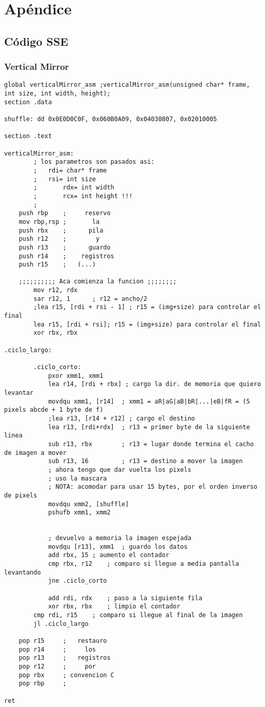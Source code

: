 \section{Ap\'endice}
\subsection{C\'odigo SSE}
\subsubsection{Vertical Mirror}
\begin{verbatim}
global verticalMirror_asm ;verticalMirror_asm(unsigned char* frame, int size, int width, height);
section .data

shuffle: dd 0x0E0D0C0F, 0x060B0A09, 0x04030807, 0x02010005

section .text

verticalMirror_asm:
        ; los parametros son pasados asi:
        ;	rdi= char* frame
        ;	rsi= int size
        ;       rdx= int width
        ;       rcx= int height !!!
        ;
	push rbp	;     reservo
	mov rbp,rsp	;       la
	push rbx	;      pila
	push r12	;        y
	push r13	;      guardo
	push r14	;    registros
	push r15	;   (...)

	;;;;;;;;;; Aca comienza la funcion ;;;;;;;;
        mov r12, rdx
        sar r12, 1      ; r12 = ancho/2
        ;lea r15, [rdi + rsi - 1] ; r15 = (img+size) para controlar el final
        lea r15, [rdi + rsi]; r15 = (img+size) para controlar el final
        xor rbx, rbx
        
.ciclo_largo:
        
        .ciclo_corto:
            pxor xmm1, xmm1
            lea r14, [rdi + rbx] ; cargo la dir. de memoria que quiero levantar
            movdqu xmm1, [r14]	; xmm1 = aR|aG|aB|bR|...|eB|fR = (5 pixels abcde + 1 byte de f)	
            ;lea r13, [r14 + r12] ; cargo el destino
            lea r13, [rdi+rdx]  ; r13 = primer byte de la siguiente linea
            sub r13, rbx        ; r13 = lugar donde termina el cacho de imagen a mover
            sub r13, 16         ; r13 = destino a mover la imagen
            ; ahora tengo que dar vuelta los pixels
            ; uso la mascara
            ; NOTA: acomodar para usar 15 bytes, por el orden inverso de pixels
            movdqu xmm2, [shuffle]
            pshufb xmm1, xmm2
                       
            
            ; devuelvo a memoria la imagen espejada
            movdqu [r13], xmm1  ; guardo los datos
            add rbx, 15 ; aumento el contador
            cmp rbx, r12    ; comparo si llegue a media pantalla levantando
            jne .ciclo_corto
            
            add rdi, rdx    ; paso a la siguiente fila
            xor rbx, rbx    ; limpio el contador
        cmp rdi, r15    ; comparo si llegue al final de la imagen
        jl .ciclo_largo

	pop r15		;   restauro
	pop r14		;     los
	pop r13		;   registros
	pop r12		;     por
	pop rbx		; convencion C
	pop rbp		;

ret
\end{verbatim}
